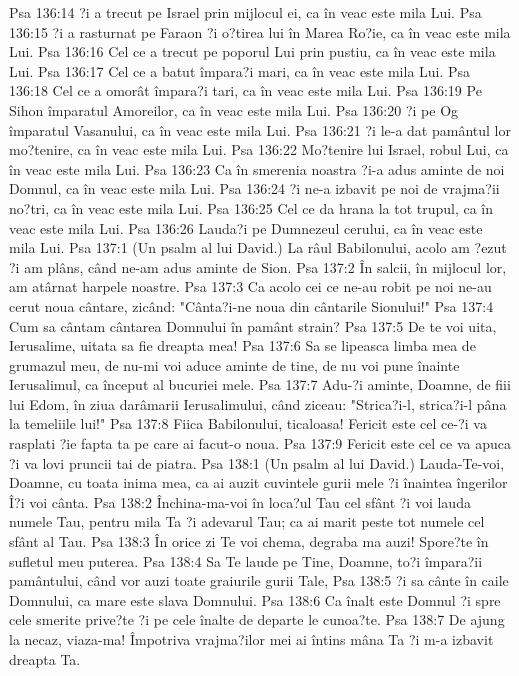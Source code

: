 Psa 136:14  ?i a trecut pe Israel prin mijlocul ei, ca în veac este mila Lui.
Psa 136:15  ?i a rasturnat pe Faraon ?i o?tirea lui în Marea Ro?ie, ca în veac este mila Lui.
Psa 136:16  Cel ce a trecut pe poporul Lui prin pustiu, ca în veac este mila Lui.
Psa 136:17  Cel ce a batut împara?i mari, ca în veac este mila Lui.
Psa 136:18  Cel ce a omorât împara?i tari, ca în veac este mila Lui.
Psa 136:19  Pe Sihon împaratul Amoreilor, ca în veac este mila Lui.
Psa 136:20  ?i pe Og împaratul Vasanului, ca în veac este mila Lui.
Psa 136:21  ?i le-a dat pamântul lor mo?tenire, ca în veac este mila Lui.
Psa 136:22  Mo?tenire lui Israel, robul Lui, ca în veac este mila Lui.
Psa 136:23  Ca în smerenia noastra ?i-a adus aminte de noi Domnul, ca în veac este mila Lui.
Psa 136:24  ?i ne-a izbavit pe noi de vrajma?ii no?tri, ca în veac este mila Lui.
Psa 136:25  Cel ce da hrana la tot trupul, ca în veac este mila Lui.
Psa 136:26  Lauda?i pe Dumnezeul cerului, ca în veac este mila Lui.
Psa 137:1  (Un psalm al lui David.) La râul Babilonului, acolo am ?ezut ?i am plâns, când ne-am adus aminte de Sion.
Psa 137:2  În salcii, în mijlocul lor, am atârnat harpele noastre.
Psa 137:3  Ca acolo cei ce ne-au robit pe noi ne-au cerut noua cântare, zicând: "Cânta?i-ne noua din cântarile Sionului!"
Psa 137:4  Cum sa cântam cântarea Domnului în pamânt strain?
Psa 137:5  De te voi uita, Ierusalime, uitata sa fie dreapta mea!
Psa 137:6  Sa se lipeasca limba mea de grumazul meu, de nu-mi voi aduce aminte de tine, de nu voi pune înainte Ierusalimul, ca început al bucuriei mele.
Psa 137:7  Adu-?i aminte, Doamne, de fiii lui Edom, în ziua darâmarii Ierusalimului, când ziceau: "Strica?i-l, strica?i-l pâna la temeliile lui!"
Psa 137:8  Fiica Babilonului, ticaloasa! Fericit este cel ce-?i va rasplati ?ie fapta ta pe care ai facut-o noua.
Psa 137:9  Fericit este cel ce va apuca ?i va lovi pruncii tai de piatra.
Psa 138:1  (Un psalm al lui David.) Lauda-Te-voi, Doamne, cu toata inima mea, ca ai auzit cuvintele gurii mele ?i înaintea îngerilor Î?i voi cânta.
Psa 138:2  Închina-ma-voi în loca?ul Tau cel sfânt ?i voi lauda numele Tau, pentru mila Ta ?i adevarul Tau; ca ai marit peste tot numele cel sfânt al Tau.
Psa 138:3  În orice zi Te voi chema, degraba ma auzi! Spore?te în sufletul meu puterea.
Psa 138:4  Sa Te laude pe Tine, Doamne, to?i împara?ii pamântului, când vor auzi toate graiurile gurii Tale,
Psa 138:5  ?i sa cânte în caile Domnului, ca mare este slava Domnului.
Psa 138:6  Ca înalt este Domnul ?i spre cele smerite prive?te ?i pe cele înalte de departe le cunoa?te.
Psa 138:7  De ajung la necaz, viaza-ma! Împotriva vrajma?ilor mei ai întins mâna Ta ?i m-a izbavit dreapta Ta.
